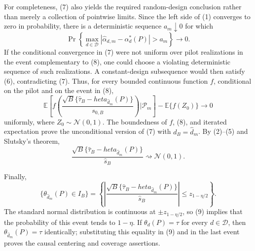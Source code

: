 For completeness, (7) also yields the required random-design conclusion rather than merely a collection of pointwise limits.  Since the left side of (1) converges to zero in probability, there is a deterministic sequence \(a_m\downarrow0\) for which
\[
 \Pr\left\{\max_{d\in\mathcal D}
 |\widehat\alpha_{d,m}-\alpha_d^*(P)|>a_m\right\}\longrightarrow0. \tag{8}
\]
If the conditional convergence in (7) were not uniform over pilot realizations in the event complementary to (8), one could choose a violating deterministic sequence of such realizations.  A constant-design subsequence would then satisfy (6), contradicting (7).  Thus, for every bounded continuous function \(f\), conditional on the pilot and on the event in (8),
\[
 \mathbb E\left[
 f\left(\frac{\sqrt B\{\widehat\tau_B-  heta_{\widehat d_m}(P)\}}
 {s_{0,B}}\right)\mathrel{\Big|}\mathcal P_m\right]
 -\mathbb E\{f(Z_0)\}\longrightarrow0
\]
uniformly, where \(Z_0\sim\mathcal N(0,1)\).  The boundedness of \(f\), (8), and iterated expectation prove the unconditional version of (7) with \(d_B=\widehat d_m\).  By (2)--(5) and Slutsky's theorem,
\[
 \frac{\sqrt B\{\widehat\tau_B-  heta_{\widehat d_m}(P)\}}
 {\widehat s_B}\rightsquigarrow\mathcal N(0,1).                   \tag{9}
\]

Finally,
\[
 \{\theta_{\widehat d_m}(P)\in I_B\}
 =\left\{
 \left|\frac{\sqrt B\{\widehat\tau_B-  heta_{\widehat d_m}(P)\}}
 {\widehat s_B}\right|\leq z_{1-\eta/2}\right\}.
\]
The standard normal distribution is continuous at \(\pm z_{1-\eta/2}\), so (9) implies that the probability of this event tends to \(1-\eta\).  If \(\theta_d(P)=\tau\) for every \(d\in\mathcal D\), then \(\theta_{\widehat d_m}(P)=\tau\) identically; substituting this equality in (9) and in the last event proves the causal centering and coverage assertions.